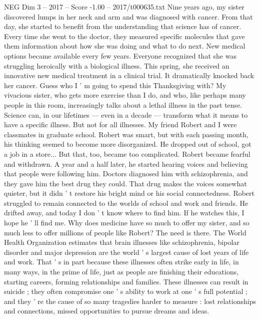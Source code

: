 \begin{textsample}{NEG Dim 3 – 2017 – Score -1.00 – 2017/t000635.txt}  \label{ex:f3_neg_070}
Nine years ago, my sister discovered lumps in her neck and arm and was diagnosed with cancer.
From that day, she started to benefit from the understanding that science has of cancer.
Every time she went to the doctor, they measured specific molecules that gave them information about how she was doing and what to do next.
New medical options became available every few years.
Everyone recognized that she was struggling heroically with a biological illness.
This spring, she received an innovative new medical treatment in a clinical trial.
It dramatically knocked back her cancer.
Guess who I ' m going to spend this Thanksgiving with?
My vivacious sister, who gets more exercise than I do, and who, like perhaps many people in this room, increasingly talks about a lethal illness in the past tense.
Science can, in our lifetimes — even in a decade — transform what it means to have a specific illness.
But not for all illnesses.
My friend Robert and I were classmates in graduate school.
Robert was smart, but with each passing month, his thinking seemed to become more disorganized.
He dropped out of school, got a job in a store...
But that, too, became too complicated.
Robert became fearful and withdrawn.
A year and a half later, he started hearing voices and believing that people were following him.
Doctors diagnosed him with schizophrenia, and they gave him the best drug they could.
That drug makes the voices somewhat quieter, but it didn ' t restore his bright mind or his social connectedness.
Robert struggled to remain connected to the worlds of school and work and friends.
He drifted away, and today I don ' t know where to find him.
If he watches this, I hope he ' ll find me.
Why does medicine have so much to offer my sister, and so much less to offer millions of people like Robert?
The need is there.
The World Health Organization estimates that brain illnesses like schizophrenia, bipolar disorder and major depression are the world ' s largest cause of lost years of life and work.
That ' s in part because these illnesses often strike early in life, in many ways, in the prime of life, just as people are finishing their educations, starting careers, forming relationships and families.
These illnesses can result in suicide ; they often compromise one ' s ability to work at one ' s full potential ; and they ' re the cause of so many tragedies harder to measure : lost relationships and connections, missed opportunities to pursue dreams and ideas.

\end{textsample}
